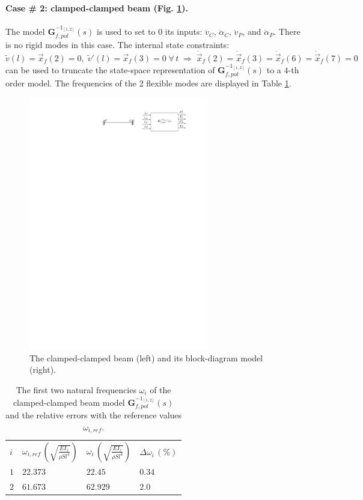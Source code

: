 \documentclass[smallcondensed]{svjour3}     %
\begin{document}
\FloatBarrier
\paragraph{Case \# 2: clamped-clamped beam (Fig. \ref{fig:Tcc}).} The model $\mathbf{G}_{f,pol}^{-1_{[1,2]}}(s)$ is used to set to $0$ its inputs: $\ddot{v}_C$, $\ddot{\alpha}_C$, $\ddot{v}_P$, and $\ddot{\alpha}_P$. There is no rigid modes in this case. The internal state constraints:
\[
\widetilde{v}(l)=\vec{x}_f(2)=0,\;\widetilde{v}'(l)=\vec{x}_f(3)=0\;\forall\,t\;\Rightarrow\;\dot{\vec{x}}_f(2)=\dot{\vec{x}}_f(3)=\dot{\vec{x}}_f(6)=\dot{\vec{x}}_f(7)=0
\]
can be used to truncate the state-space representation of $\mathbf{G}_{f,pol}^{-1_{[1,2]}}(s)$ to a $4$-th order model. The frequencies of the 2 flexible modes are displayed in Table \ref{tab:Tcc}.
\begin{figure}[htbp!]
  \includegraphics[width=0.7\textwidth]{Tccb}
\caption{The clamped-clamped beam (left) and its block-diagram model (right).}
\label{fig:Tcc} 
\end{figure}
\begin{table}[htbp!]
\caption{The first two natural frequencies $\omega_i$ of the clamped-clamped beam model $\mathbf{G}_{f,pol}^{-1_{[1,2]}}(s)$ and the relative errors with the reference values $\omega_{i,ref}$.}
\label{tab:Tcc}       %
\begin{tabular}{llll}
\hline\noalign{\smallskip}
  $i$ & $\omega_{i,ref}\,\left(\sqrt{\frac{EI_z}{\rho S l^4}}\right)$ &  $\omega_i\,\left(\sqrt{\frac{EI_z}{\rho S l^4}}\right)$ &  $\Delta \omega_i\,(\%)$ \\
\noalign{\smallskip}\hline\noalign{\smallskip}
$1$ & $22.373$ & $22.45$  & $0.34$ \\ 
$2$ & $61.673$ & $62.929$ & $2.0$ \\
\hline
\end{tabular}
\end{table}
\end{document}
